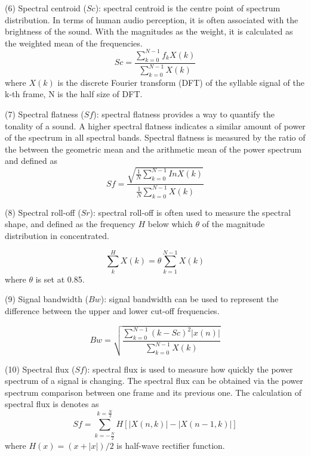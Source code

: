 \vspace{3mm}
\noindent(6) Spectral centroid ($Sc$): spectral centroid is the centre point of spectrum distribution. In terms of human audio perception, it is often associated with the brightness of the sound. With the magnitudes as the weight, it is calculated as the weighted mean of the frequencies.
\begin{equation}
Sc=\frac{\sum_{k=0}^{N-1}f_{k}X(k)}{\sum_{k=0}^{N-1}X(k)}
\end{equation}
where $X(k)$ is the discrete Fourier transform (DFT) of the syllable signal of the k-th frame, N is the half size of DFT. 

\vspace{3mm}
\noindent(7) Spectral flatness ($Sf$): spectral flatness provides a way to quantify the tonality of a sound. A higher spectral flatness indicates a similar amount of power of the spectrum in all spectral bands. Spectral flatness is measured by the ratio of the between the geometric mean and the arithmetic mean of the power spectrum and defined as
\begin{equation}
Sf = \frac{\sqrt{\frac{1}{N}\sum_{k=0}^{N-1}InX(k)}}{\frac{1}{N}\sum_{k=0}^{N-1}X(k)}
\end{equation}

\vspace{3mm}

\noindent(8) Spectral roll-off ($Sr$): spectral roll-off is often used to measure the spectral shape, and defined as the frequency $H$ below which $\theta$ of the magnitude distribution in concentrated.

\begin{equation}
\sum_{k}^{H}X(k)=\theta \sum_{k=1}^{N-1}X(k)
\end{equation}
where $\theta$ is set at 0.85.

\vspace{3mm}

\noindent(9) Signal bandwidth ($Bw$): signal bandwidth can be used to represent the difference between the upper and lower cut-off frequencies.

\begin{equation}
Bw=\sqrt{\frac{\sum_{k=0}^{N-1}(k-Sc)^{2}|x(n)|}{\sum_{k=0}^{N-1}X(k)}}
\end{equation} 

\vspace{3mm}

\noindent(10) Spectral flux ($Sf$): spectral flux is used to measure how quickly the power spectrum of a signal is changing. The spectral flux can be obtained via the power spectrum comparison between one frame and its previous one. The calculation of spectral flux is denotes as
\begin{equation}
Sf = \sum_{k=-\frac{N}{2}}^{k=\frac{N}{2}}H[|X(n,k)|-|X(n-1,k)|]
\end{equation}
where $H(x)=(x+|x|)/2$ is half-wave rectifier function.

